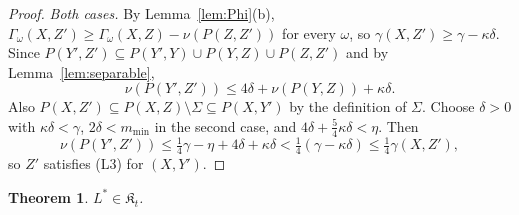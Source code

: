 \documentclass[11pt]{article}
\newtheorem{theorem}{Theorem}[section]
\theoremstyle{definition}
\newcommand{\K}{\mathfrak K}
\begin{document}
\begin{proof}
\emph{Both cases.} By Lemma~\ref{lem:Phi}(b), $\Gamma_\omega(X,Z')\ge\Gamma_\omega(X,Z)-\nu(P(Z,Z'))$ for every $\omega$, so $\gamma(X,Z')\ge\gamma-\kappa\delta$. Since $P(Y',Z')\subseteq P(Y',Y)\cup P(Y,Z)\cup P(Z,Z')$ and by Lemma~\ref{lem:separable},
\[
\nu(P(Y',Z'))\le4\delta+\nu(P(Y,Z))+\kappa\delta.
\]
Also $P(X,Z')\subseteq P(X,Z)\setminus\Sigma\subseteq P(X,Y')$ by the definition of $\Sigma$. Choose $\delta>0$ with $\kappa\delta<\gamma$, $2\delta<m_{\min}$ in the second case, and $4\delta+\frac54\kappa\delta<\eta$. Then
\[
\nu(P(Y',Z'))\le\tfrac14\gamma-\eta+4\delta+\kappa\delta<\tfrac14(\gamma-\kappa\delta)\le\tfrac14\gamma(X,Z'),
\]
so $Z'$ satisfies (L3) for $(X,Y')$.
\end{proof}

\begin{theorem}\label{thm:R-in-class}
$L^\ast\in\K_t$.
\end{theorem}
\end{document}
